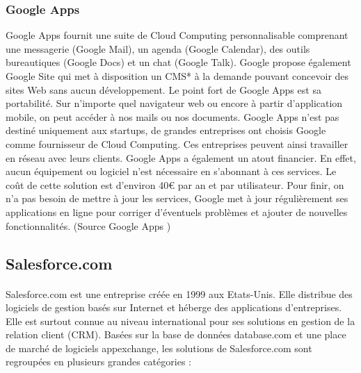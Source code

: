 \documentclass[a4paper,12pt]{report}
\begin{document}
\begin{onehalfspace}
	\subsubsection*{Google Apps}
	Google Apps fournit une suite de Cloud Computing personnalisable comprenant une messagerie (Google Mail), un agenda (Google Calendar), des outils bureautiques (Google Docs) et un chat (Google Talk). Google propose également Google Site qui met à disposition un CMS* à la demande pouvant concevoir des sites Web sans aucun développement.\newline
Le point fort de Google Apps est sa portabilité. Sur n’importe quel navigateur web ou encore à partir d’application mobile, on peut accéder à nos mails ou nos documents. Google Apps n’est pas destiné uniquement aux startups, de grandes entreprises ont choisis Google comme fournisseur de Cloud Computing. Ces entreprises peuvent ainsi travailler en réseau avec leurs clients.\newline
Google Apps a également un atout financier. En effet, aucun équipement ou logiciel n’est nécessaire en s’abonnant à ces services. Le coût de cette solution est d’environ 40\euro{} par an et par utilisateur. Pour finir, on n’a pas besoin de mettre à jour les services, Google met à jour régulièrement ses applications en ligne pour corriger d'éventuels problèmes et ajouter de nouvelles fonctionnalités. (Source Google Apps \cite{source:ggapp})

	\subsection{Salesforce.com}

	\paragraph*{}
	Salesforce.com est une entreprise créée en 1999 aux Etats-Unis. Elle distribue des logiciels de gestion basés sur Internet et héberge des applications d'entreprises. Elle est surtout connue au niveau international pour ses solutions en gestion de la relation client (CRM). Basées sur la base de données database.com et une place de marché de logiciels appexchange, les solutions de Salesforce.com sont regroupées en plusieurs grandes catégories : 

\end{onehalfspace}
\end{document}
